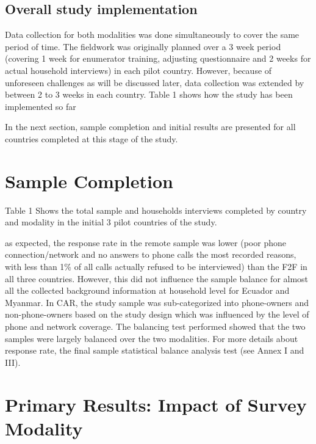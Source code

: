 \documentclass[11pt,harvard]{article}
\begin{document}
	\subsection{Overall study implementation}

Data collection for both modalities was done simultaneously to cover the same period of time. The fieldwork was originally planned over a 3 week period (covering 1 week for enumerator training, adjusting questionnaire and 2 weeks for actual household interviews) in each pilot country. However, because of unforeseen challenges as will be discussed later, data collection was extended by between 2 to 3 weeks in each country. Table 1 shows how the study has been implemented so far

In the next section, sample completion and initial results are presented for all countries completed at this stage of the study.

\pagebreak
	
\section{Sample Completion}

Table 1 Shows the total sample and households interviews completed by country and modality in the initial 3 pilot countries of the study.

 
\label{tab:rCARI_Overall_Completion}

as expected, the response rate in the remote sample was lower (poor phone connection/network and no answers to phone calls the most recorded reasons, with less than 1\% of all calls actually refused to be interviewed) than the F2F in all three countries. However, this did not influence the sample balance for almost all the collected background information at household level for Ecuador and Myanmar. 
In CAR, the study sample was sub-categorized into phone-owners and non-phone-owners based on the study design which was influenced by the level of phone and network coverage. The balancing test performed showed that the two samples were largely balanced over the two modalities. For more details about response rate, the final sample statistical balance analysis test (see Annex I and III).


\pagebreak

\section{Primary Results: Impact of Survey Modality}
\end{document}
